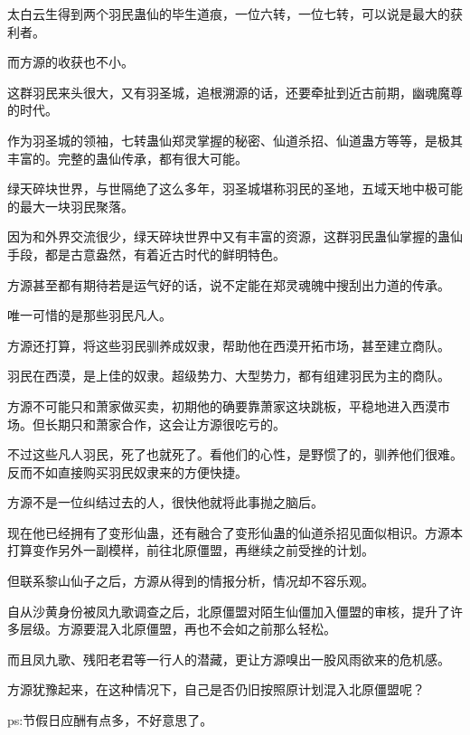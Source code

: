 \begin{this_body}
太白云生得到两个羽民蛊仙的毕生道痕，一位六转，一位七转，可以说是最大的获利者。

而方源的收获也不小。

这群羽民来头很大，又有羽圣城，追根溯源的话，还要牵扯到近古前期，幽魂魔尊的时代。

作为羽圣城的领袖，七转蛊仙郑灵掌握的秘密、仙道杀招、仙道蛊方等等，是极其丰富的。完整的蛊仙传承，都有很大可能。

绿天碎块世界，与世隔绝了这么多年，羽圣城堪称羽民的圣地，五域天地中极可能的最大一块羽民聚落。

因为和外界交流很少，绿天碎块世界中又有丰富的资源，这群羽民蛊仙掌握的蛊仙手段，都是古意盎然，有着近古时代的鲜明特色。

方源甚至都有期待若是运气好的话，说不定能在郑灵魂魄中搜刮出力道的传承。

唯一可惜的是那些羽民凡人。

方源还打算，将这些羽民驯养成奴隶，帮助他在西漠开拓市场，甚至建立商队。

羽民在西漠，是上佳的奴隶。超级势力、大型势力，都有组建羽民为主的商队。

方源不可能只和萧家做买卖，初期他的确要靠萧家这块跳板，平稳地进入西漠市场。但长期只和萧家合作，这会让方源很吃亏的。

不过这些凡人羽民，死了也就死了。看他们的心性，是野惯了的，驯养他们很难。反而不如直接购买羽民奴隶来的方便快捷。

方源不是一位纠结过去的人，很快他就将此事抛之脑后。

现在他已经拥有了变形仙蛊，还有融合了变形仙蛊的仙道杀招见面似相识。方源本打算变作另外一副模样，前往北原僵盟，再继续之前受挫的计划。

但联系黎山仙子之后，方源从得到的情报分析，情况却不容乐观。

自从沙黄身份被凤九歌调查之后，北原僵盟对陌生仙僵加入僵盟的审核，提升了许多层级。方源要混入北原僵盟，再也不会如之前那么轻松。

而且凤九歌、残阳老君等一行人的潜藏，更让方源嗅出一股风雨欲来的危机感。

方源犹豫起来，在这种情况下，自己是否仍旧按照原计划混入北原僵盟呢？

ps:节假日应酬有点多，不好意思了。

\end{this_body}

